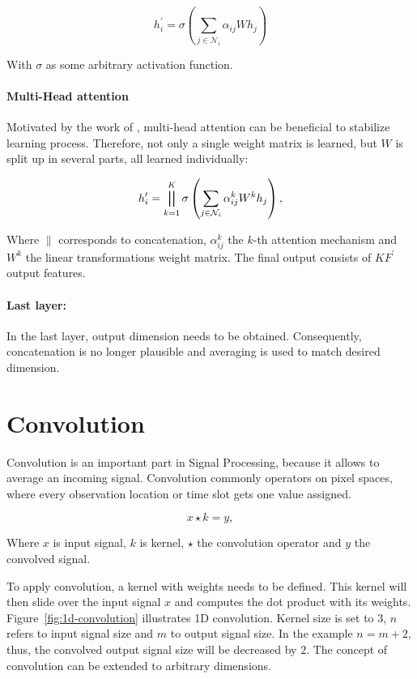 \begin{equation}
  h_i^{\prime} = \sigma \left( \sum_{j \in \mathcal{N}_i} \alpha_{ij} W h_j \right)
\end{equation}

With $\sigma$ as some arbitrary activation function.

\paragraph{Multi-Head attention}
Motivated by the work of \citet{transformer}, multi-head attention can be beneficial to stabilize learning process.
Therefore, not only a single weight matrix is learned, but $W$ is split up in several parts, 
all learned individually:

\begin{equation}
  h_i^{\prime} = \bigparallel^K_{k=1} \sigma \left(\sum_{j \in \mathcal{N}_i} \alpha_{ij}^k W^k h_j \right),  
\end{equation}

Where $\parallel$ corresponds to concatenation, $\alpha_{ij}^k$ the $k$-th attention mechanism and $W^k$ the linear
transformations weight matrix. The final output consists of $KF^{\prime}$ output features.

\paragraph{Last layer:}
In the last layer, output dimension needs to be obtained. 
Consequently, concatenation is no longer plausible and averaging is used to match desired dimension.

\section{Convolution}
Convolution is an important part in Signal Processing, because it allows to average an incoming signal.
Convolution commonly operators on pixel spaces, where every observation location or time slot gets one value assigned.

\begin{equation}
  x \star k = y,
\end{equation}

Where $x$ is input signal, $k$ is kernel, $\star$ the convolution operator and $y$ the convolved signal.

To apply convolution, a kernel with weights needs to be defined. 
This kernel will then slide over the input signal $x$ and computes the dot product with its weights.
Figure~\ref{fig:1d-convolution} illustrates 1D convolution. Kernel size is set to 3, $n$ refers to input signal size and $m$ to output signal size.
In the example  $ n = m + 2$, thus, the convolved output signal size will be decreased by $2$.
The concept of convolution can be extended to arbitrary dimensions.


